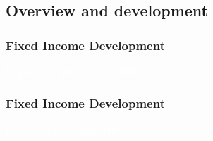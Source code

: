 \documentclass[compress]{beamer}
\begin{document}
\subsection{Overview and development}
{
\begin{frame}[plain]
	\frametitle{Fixed Income Development}
	\textcolor{white}{RQuantLib before GSOC 2009...}
	\begin{center}
	\end{center}
\end{frame}
\begin{frame}[plain]
	\frametitle{Fixed Income Development}
	\textcolor{white}{GSOC started. April 2009..}
	\begin{center}

\end{center}
\end{frame}}
\end{document}
